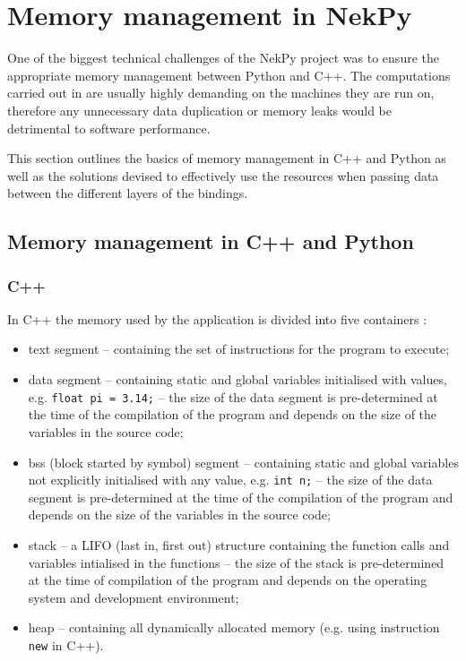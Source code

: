 \chapter{Memory management in NekPy}

One of the biggest technical challenges of the NekPy project was to ensure the appropriate 
memory management between Python and C++. The computations carried out in \nek{} are 
usually highly demanding on the machines they are run on, therefore any unnecessary data 
duplication or memory leaks would be detrimental to software performance.

This section outlines the basics of memory management in C++ and Python as well as the 
solutions devised to effectively use the resources when passing data between the different 
layers of the bindings.

\section{Memory management in C++ and Python}

\subsection{C++}

In C++ the memory used by the application is divided into five containers \cite{C++Memory}:
\begin{itemize}
    \item text segment -- containing the set of instructions for the program to execute;
    \item data segment -- containing static and global variables initialised with values, 
    e.g. \texttt{float pi = 3.14;} -- the size of the data segment is pre-determined at 
    the time of the compilation of the program and depends on the size of the variables 
    in the source code;
    \item bss (block started by symbol) segment -- containing static and global variables 
    not explicitly initialised with any value, e.g. \texttt{int n;} -- the size of the 
    data segment is pre-determined at the time of the compilation of the program and 
    depends on the size of the variables in the source code;
    \item stack -- a LIFO (last in, first out) structure containing the function calls 
    and variables intialised in the functions -- the size of the stack is pre-determined 
    at the time of compilation of the program and depends on the operating system and 
    development environment;
    \item heap -- containing all dynamically allocated memory (e.g. using instruction 
    \texttt{new} in C++).
\end{itemize}

